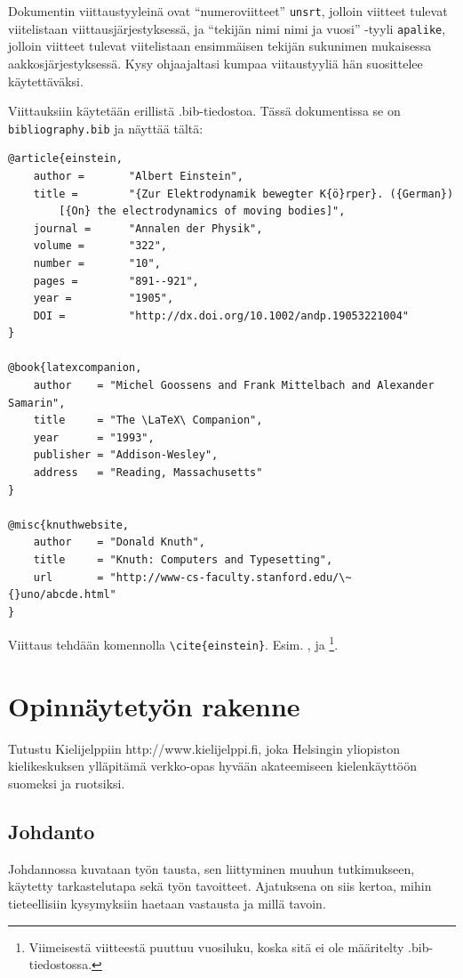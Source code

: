 \documentclass[finnish,twoside,openright,utf]{HYgradu}
\begin{document}
Dokumentin viittaustyyleinä ovat ``numeroviitteet'' \texttt{unsrt}, jolloin viitteet tulevat viitelistaan viittausjärjestyksessä,  ja  ``tekijän nimi nimi ja vuosi'' -tyyli \texttt{apalike}, jolloin viitteet tulevat viitelistaan ensimmäisen tekijän sukunimen mukaisessa aakkosjärjestyksessä. Kysy ohjaajaltasi kumpaa viitaustyyliä hän suosittelee käytettäväksi.

Viittauksiin käytetään erillistä .bib-tiedostoa. Tässä dokumentissa se on \texttt{bibliography.bib} ja näyttää tältä:
\begin{verbatim}
@article{einstein,
    author =       "Albert Einstein",
    title =        "{Zur Elektrodynamik bewegter K{ö}rper}. ({German})
        [{On} the electrodynamics of moving bodies]",
    journal =      "Annalen der Physik",
    volume =       "322",
    number =       "10",
    pages =        "891--921",
    year =         "1905",
    DOI =          "http://dx.doi.org/10.1002/andp.19053221004"
}
 
@book{latexcompanion,
    author    = "Michel Goossens and Frank Mittelbach and Alexander Samarin",
    title     = "The \LaTeX\ Companion",
    year      = "1993",
    publisher = "Addison-Wesley",
    address   = "Reading, Massachusetts"
}
 
@misc{knuthwebsite,
    author    = "Donald Knuth",
    title     = "Knuth: Computers and Typesetting",
    url       = "http://www-cs-faculty.stanford.edu/\~{}uno/abcde.html"
}
\end{verbatim}

Viittaus tehdään komennolla \texttt{\textbackslash cite\{einstein\}}. Esim. 
\cite{einstein}, \cite{latexcompanion} ja \cite{knuthwebsite}\footnote{Viimeisestä viitteestä puuttuu vuosiluku, koska sitä ei ole määritelty .bib-tiedostossa.}.

\chapter{ Opinnäytetyön rakenne}

Tutustu Kielijelppiin http://www.kielijelppi.fi, joka Helsingin  yliopiston kielikeskuksen ylläpitämä verkko-opas hyvään akateemiseen kielenkäyttöön suomeksi ja ruotsiksi.  

\section{Johdanto}
Johdannossa kuvataan työn tausta, sen liittyminen muuhun tutkimukseen, käytetty tarkastelutapa sekä työn tavoitteet. Ajatuksena on siis kertoa, mihin tieteellisiin kysymyksiin haetaan vastausta ja millä tavoin.
\end{document}
